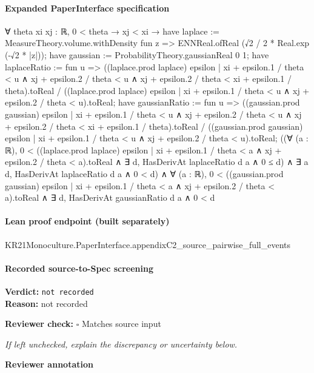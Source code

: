 \documentclass[10pt]{article}
\newcommand{\reviewerbox}{%
  \par\noindent\fbox{\parbox{0.96\linewidth}{\rule{0pt}{0.38in}}}\par
}
\newcommand{\reviewmatch}[1]{%
  \par\noindent\textbf{Reviewer check:} $\square$\; #1\par
  \noindent\emph{If left unchecked, explain the discrepancy or uncertainty below.}\par
}
\begin{document}
\paragraph{Expanded PaperInterface specification}
\begin{ReviewVerbatim}
∀ {theta xi xj : ℝ},
  0 < theta →
    xj < xi →
      have laplace := MeasureTheory.volume.withDensity fun z => ENNReal.ofReal (√2 / 2 * Real.exp (-√2 * |z|));
      have gaussian := ProbabilityTheory.gaussianReal 0 1;
      have laplaceRatio := fun u =>
        ((laplace.prod laplace)
              {epsilon |
                xi + epsilon.1 / theta < u ∧
                  xj + epsilon.2 / theta < u ∧ xj + epsilon.2 / theta < xi + epsilon.1 / theta}).toReal /
          ((laplace.prod laplace) {epsilon | xi + epsilon.1 / theta < u ∧ xj + epsilon.2 / theta < u}).toReal;
      have gaussianRatio := fun u =>
        ((gaussian.prod gaussian)
              {epsilon |
                xi + epsilon.1 / theta < u ∧
                  xj + epsilon.2 / theta < u ∧ xj + epsilon.2 / theta < xi + epsilon.1 / theta}).toReal /
          ((gaussian.prod gaussian) {epsilon | xi + epsilon.1 / theta < u ∧ xj + epsilon.2 / theta < u}).toReal;
      ((∀ (a : ℝ),
            0 < ((laplace.prod laplace) {epsilon | xi + epsilon.1 / theta < a ∧ xj + epsilon.2 / theta < a}).toReal ∧
              ∃ d, HasDerivAt laplaceRatio d a ∧ 0 ≤ d) ∧
          ∃ a d, HasDerivAt laplaceRatio d a ∧ 0 < d) ∧
        ∀ (a : ℝ),
          0 < ((gaussian.prod gaussian) {epsilon | xi + epsilon.1 / theta < a ∧ xj + epsilon.2 / theta < a}).toReal ∧
            ∃ d, HasDerivAt gaussianRatio d a ∧ 0 < d
\end{ReviewVerbatim}

\paragraph{Lean proof endpoint (built separately)}\begin{ReviewVerbatim}
KR21Monoculture.PaperInterface.appendixC2_source_pairwise_full_events
\end{ReviewVerbatim}

\paragraph{Recorded source-to-Spec screening}
\textbf{Verdict:} \texttt{not recorded}
\\
\textbf{Reason:} not recorded
\reviewmatch{Matches source input}
\noindent\textbf{Reviewer annotation}\par
\reviewerbox
\clearpage
\hypertarget{source-claim-d11ceae944c696a3}{}
\end{document}
